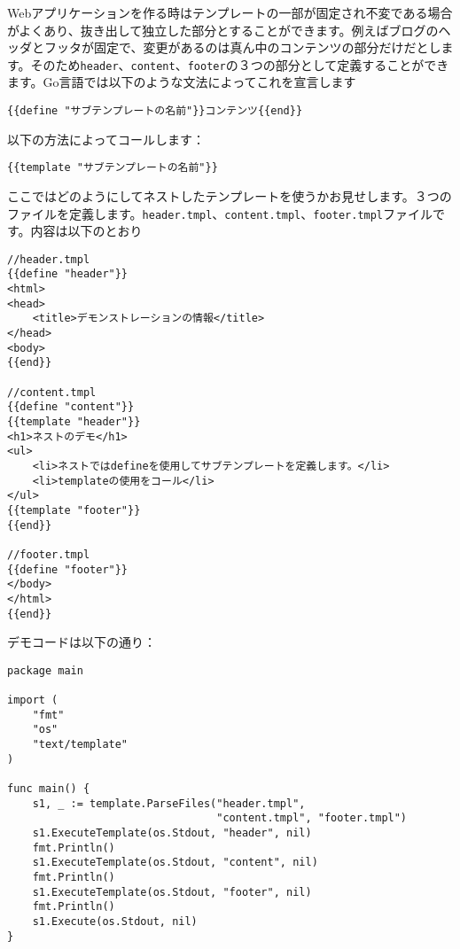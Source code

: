 Webアプリケーションを作る時はテンプレートの一部が固定され不変である場合がよくあり、抜き出して独立した部分とすることができます。例えばブログのヘッダとフッタが固定で、変更があるのは真ん中のコンテンツの部分だけだとします。そのため\texttt{header}、\texttt{content}、\texttt{footer}の３つの部分として定義することができます。Go言語では以下のような文法によってこれを宣言します


\begin{lstlisting}[numbers=none]
{{define "サブテンプレートの名前"}}コンテンツ{{end}}
\end{lstlisting}

以下の方法によってコールします：

\begin{lstlisting}[numbers=none]
{{template "サブテンプレートの名前"}}
\end{lstlisting}

ここではどのようにしてネストしたテンプレートを使うかお見せします。３つのファイルを定義します。\texttt{header.tmpl}、\texttt{content.tmpl}、\texttt{footer.tmpl}ファイルです。内容は以下のとおり



\begin{lstlisting}[numbers=none]
//header.tmpl
{{define "header"}}
<html>
<head>
    <title>デモンストレーションの情報</title>
</head>
<body>
{{end}}

//content.tmpl
{{define "content"}}
{{template "header"}}
<h1>ネストのデモ</h1>
<ul>
    <li>ネストではdefineを使用してサブテンプレートを定義します。</li>
    <li>templateの使用をコール</li>
</ul>
{{template "footer"}}
{{end}}

//footer.tmpl
{{define "footer"}}
</body>
</html>
{{end}}
\end{lstlisting}

デモコードは以下の通り：

\begin{lstlisting}[numbers=none]
package main

import (
    "fmt"
    "os"
    "text/template"
)

func main() {
    s1, _ := template.ParseFiles("header.tmpl",
                                 "content.tmpl", "footer.tmpl")
    s1.ExecuteTemplate(os.Stdout, "header", nil)
    fmt.Println()
    s1.ExecuteTemplate(os.Stdout, "content", nil)
    fmt.Println()
    s1.ExecuteTemplate(os.Stdout, "footer", nil)
    fmt.Println()
    s1.Execute(os.Stdout, nil)
}
\end{lstlisting}

